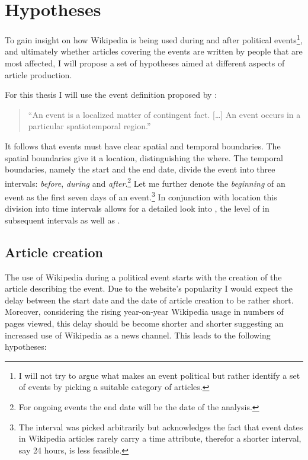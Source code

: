 \chapter{Hypotheses}\label{ch:hypotheses}

To gain insight on how Wikipedia is being used during and after political events\footnote{I will not try to argue what makes an event political but rather identify a set of events by picking a suitable category of articles.}, and ultimately whether articles covering the events are written by people that are most affected, I will propose a set of hypotheses aimed at different aspects of article production.

For this thesis I will use the event definition proposed by \textcite[243]{lewis1987philosophical}: 
\begin{quotation}
``An event is a localized matter of contingent fact. [\ldots] An event occurs in a particular spatiotemporal region.''
\end{quotation}
It follows that events must have clear spatial and temporal boundaries.
The spatial boundaries give it a location, distinguishing the where.
The temporal boundaries, namely the start and the end date, divide the event into three intervals: \emph{before}, \emph{during} and \emph{after}.\footnote{For ongoing events the end date will be the date of the analysis.}
Let me further denote the \emph{beginning} of an event as the first seven days of an event.\footnote{The interval was picked arbitrarily but acknowledges the fact that event dates in Wikipedia articles rarely carry a time attribute, therefor a shorter interval, say 24 hours, is less feasible.}
In conjunction with location this division into time intervals allows for a detailed look into , the level of  in subsequent intervals as well as .

\section{Article creation}\label{sec:articlecreation}

The use of Wikipedia during a political event starts with the creation of the article describing the event.
Due to the website's popularity I would expect the delay between the start date and the date of article creation to be rather short.
Moreover, considering the rising year-on-year Wikipedia usage in numbers of pages viewed\cite{wikipv}, this delay should be become shorter and shorter suggesting an increased use of Wikipedia as a news channel.
This leads to the following hypotheses:

